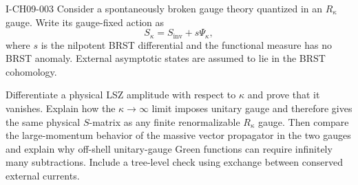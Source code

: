 \begin{exercise}{I-CH09-003}
Consider a spontaneously broken gauge theory quantized in an $R_\kappa$
gauge.  Write its gauge-fixed action as
\[
  S_\kappa=S_{\mathrm{inv}}+s\Psi_\kappa,
\]
where $s$ is the nilpotent BRST differential and the functional measure has no
BRST anomaly.  External asymptotic states are assumed to lie in the BRST
cohomology.

Differentiate a physical LSZ amplitude with respect to $\kappa$ and prove that
it vanishes.  Explain how the $\kappa\to\infty$ limit imposes unitary gauge and
therefore gives the same physical $S$-matrix as any finite renormalizable
$R_\kappa$ gauge.  Then compare the large-momentum behavior of the massive
vector propagator in the two gauges and explain why off-shell unitary-gauge
Green functions can require infinitely many subtractions.  Include a
tree-level check using exchange between conserved external currents.
\end{exercise}
